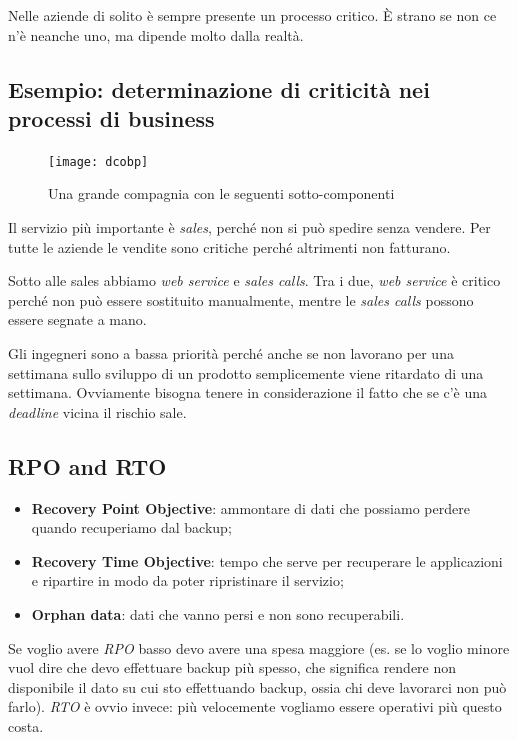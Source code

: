Nelle aziende di solito è sempre presente un processo critico. È strano se non
ce n'è neanche uno, ma dipende molto dalla realtà.

\subsection{Esempio: determinazione di criticità nei processi di business}

\begin{figure}[H]
 \centering
 \texttt{[image: dcobp]}
 \caption{Una grande compagnia con le seguenti sotto-componenti}
\end{figure}

Il servizio più importante è \textit{sales}, perché non si può spedire senza
vendere. Per tutte le aziende le vendite sono critiche perché altrimenti non
fatturano.

Sotto alle sales abbiamo \textit{web service} e \textit{sales calls}. Tra i
due, \textit{web service} è critico perché non può essere sostituito
manualmente, mentre le \textit{sales calls} possono essere segnate a mano.

Gli ingegneri sono a bassa priorità perché anche se non lavorano per una
settimana sullo sviluppo di un prodotto semplicemente viene ritardato di una
settimana. Ovviamente bisogna tenere in considerazione il fatto che se c'è una
\textit{deadline} vicina il rischio sale.

\subsection{RPO and RTO}

\begin{itemize}
 \item \textbf{Recovery Point Objective}: ammontare di dati che possiamo
perdere quando recuperiamo dal backup;

 \item \textbf{Recovery Time Objective}: tempo che serve per recuperare le
applicazioni e ripartire in modo da poter ripristinare il servizio;

 \item \textbf{Orphan data}: dati che vanno persi e non sono recuperabili.
\end{itemize}

Se voglio avere \textit{RPO} basso devo avere una spesa maggiore (es. se lo
voglio minore vuol dire che devo effettuare backup più spesso, che significa
rendere non disponibile il dato su cui sto effettuando backup, ossia chi deve
lavorarci non può farlo).
\textit{RTO} è ovvio invece: più velocemente vogliamo essere operativi più
questo costa.

